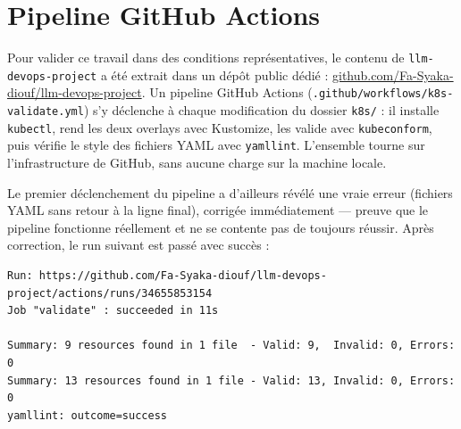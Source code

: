 ﻿\documentclass[11pt,a4paper]{article}
\begin{document}
\section{Pipeline GitHub Actions}
\label{sec:cicd}

Pour valider ce travail dans des conditions représentatives, le contenu de \texttt{llm-devops-project} a été extrait dans un dépôt public dédié : \href{https://github.com/Fa-Syaka-diouf/llm-devops-project}{github.com/Fa-Syaka-diouf/llm-devops-project}. Un pipeline GitHub Actions (\texttt{.github/workflows/k8s-validate.yml}) s'y déclenche à chaque modification du dossier \texttt{k8s/} : il installe \texttt{kubectl}, rend les deux overlays avec Kustomize, les valide avec \texttt{kubeconform}, puis vérifie le style des fichiers YAML avec \texttt{yamllint}. L'ensemble tourne sur l'infrastructure de GitHub, sans aucune charge sur la machine locale.

Le premier déclenchement du pipeline a d'ailleurs révélé une vraie erreur (fichiers YAML sans retour à la ligne final), corrigée immédiatement --- preuve que le pipeline fonctionne réellement et ne se contente pas de toujours réussir. Après correction, le run suivant est passé avec succès :

\begin{lstlisting}
Run: https://github.com/Fa-Syaka-diouf/llm-devops-project/actions/runs/34655853154
Job "validate" : succeeded in 11s

Summary: 9 resources found in 1 file  - Valid: 9,  Invalid: 0, Errors: 0
Summary: 13 resources found in 1 file - Valid: 13, Invalid: 0, Errors: 0
yamllint: outcome=success
\end{lstlisting}
\end{document}
